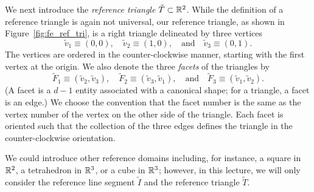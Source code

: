   
We next introduce the \emph{reference triangle} $\tilde T \subset \mathbb{R}^2$. While the definition of a reference triangle is again not universal, our reference triangle, as shown in Figure~\ref{fig:fe_ref_tri}, is a right triangle delineated by three vertices
\begin{equation*}
  \tilde v_1 \equiv (0,0), \quad \tilde v_2 \equiv (1,0), \quad \text{and} \quad \tilde v_3 \equiv (0,1).
\end{equation*}
The vertices are ordered in the counter-clockwise manner, starting with the first vertex at the origin. We also denote the three \emph{facets} of the triangles by
\begin{equation*}
  \tilde F_1 \equiv ( \tilde v_2, \tilde v_3), \quad  \tilde F_2 \equiv ( \tilde v_3, \tilde v_1), \quad \text{and} \quad  \tilde F_3 \equiv ( \tilde v_1, \tilde v_2).
\end{equation*}
(A facet is a $d-1$ entity associated with a canonical shape; for a triangle, a facet is an edge.)  We choose the convention that the facet number is the same as the vertex number of the vertex on the other side of the triangle. Each facet is oriented such that the collection of the three edges defines the triangle in the counter-clockwise orientation.  

We could introduce other reference domains including, for instance, a square in $\mathbb{R}^2$, a tetrahedron in $\mathbb{R}^3$, or a cube in $\mathbb{R}^3$; however, in this lecture, we will only consider the reference line segment $\tilde I$ and the reference triangle $\tilde T$.  

